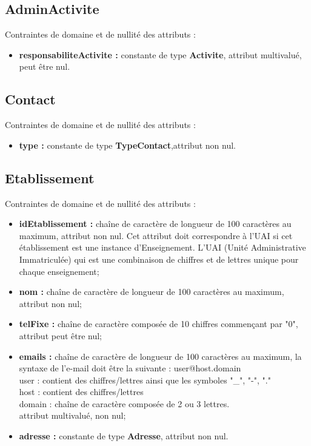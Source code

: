 \documentclass[asi, sansVersion]{picInsa}
\begin{document}
\subsection*{AdminActivite}
Contraintes de domaine et de nullité des attributs :
\begin{itemize}
\item \textbf{responsabiliteActivite :} constante de type \textbf{Activite}, attribut multivalué, peut être nul.\\
\end{itemize}

 
\subsection*{Contact}
Contraintes de domaine et de nullité des attributs :
 \begin{itemize}
 \item \textbf{type :} constante de type \textbf{TypeContact},attribut non nul.\\
 \end{itemize}

\subsection*{Etablissement}
Contraintes de domaine et de nullité des attributs :
\begin{itemize}
 	\item \textbf{idEtablissement :} chaîne de caractère de longueur de 100 caractères au maximum, attribut non nul. Cet attribut doit correspondre à l'UAI si cet établissement est une instance d'Enseignement. L'UAI (Unité Administrative Immatriculée) qui est une combinaison de chiffres et de lettres unique pour chaque enseignement;
	\item \textbf{nom :} chaîne de caractère de longueur de 100 caractères au maximum, attribut non nul;
	\item \textbf{telFixe :} chaîne de caractère composée de 10 chiffres commençant par "0", attribut peut être nul;
	\item \textbf{emails :} chaîne de caractère de longueur de 100 caractères au maximum, la syntaxe de l'e-mail doit être la suivante : user@host.domain\\
	user : contient des chiffres/lettres ainsi que les symboles "\_", "-", "." \\
	host : contient des chiffres/lettres \\
	domain : chaîne de caractère composée de 2 ou 3 lettres. \\
	attribut multivalué, non nul; 
	\item \textbf{adresse :} constante de type \textbf{Adresse}, attribut non nul.\\
\end{itemize}  
\end{document}
